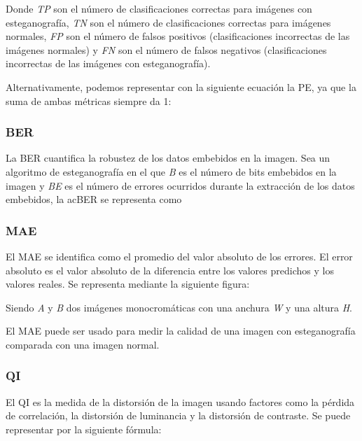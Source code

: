 
Donde \textit{TP} son el número de clasificaciones correctas para imágenes con esteganografía, \textit{TN} son el número de clasificaciones correctas para imágenes normales, \textit{FP} son el número de falsos positivos (clasificaciones incorrectas de las imágenes normales) y \textit{FN} son el número de falsos negativos (clasificaciones incorrectas de las imágenes con esteganografía).

Alternativamente, podemos representar con la siguiente ecuación la \ac{PE}, ya que la suma de ambas métricas siempre da 1:


\subsubsection{BER}

La \ac{BER} cuantifica la robustez de los datos embebidos en la imagen. Sea un algoritmo de esteganografía en el que \textit{B} es el número de bits embebidos en la imagen y \textit{BE} es el número de errores ocurridos durante la extracción de los datos embebidos, la ac{BER} se representa como


\subsubsection{MAE}

El \ac{MAE} se identifica como el promedio del valor absoluto de los errores. El error absoluto es el valor absoluto de la diferencia entre los valores predichos y los valores reales. Se representa mediante la siguiente figura:


Siendo \textit{A} y \textit{B} dos imágenes monocromáticas con una anchura \textit{W} y una altura \textit{H}.

El \ac{MAE} puede ser usado para medir la calidad de una imagen con esteganografía comparada con una imagen normal.

\subsubsection{QI}

El \ac{QI} es la medida de la distorsión de la imagen usando factores como la pérdida de correlación, la distorsión de luminancia y la distorsión de contraste. Se puede representar por la siguiente fórmula:

